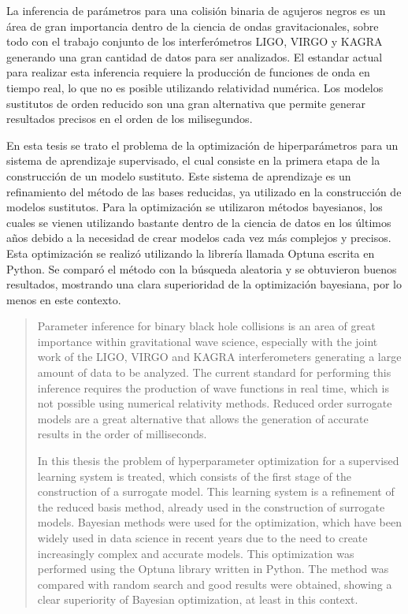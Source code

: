 \begin{resumen}%


La inferencia de parámetros para una colisión binaria de agujeros negros es un área de gran importancia dentro de la ciencia de ondas gravitacionales, sobre todo con el trabajo conjunto de los interferómetros LIGO, VIRGO y KAGRA generando una gran cantidad de datos para ser analizados. El estandar actual para realizar esta inferencia requiere la producción de funciones de onda en tiempo real, lo que no es posible utilizando relatividad numérica. Los modelos sustitutos de orden reducido son una gran alternativa que permite generar resultados precisos en el orden de los milisegundos.

En esta tesis se trato el problema de la optimización de hiperparámetros para un sistema de aprendizaje supervisado, el cual consiste en la primera etapa de la construcción de un modelo sustituto. Este sistema de aprendizaje es un refinamiento del método de las bases reducidas, ya utilizado en la construcción de modelos sustitutos. 
Para la optimización se utilizaron métodos bayesianos, los cuales se vienen utilizando bastante dentro de la ciencia de datos en los últimos años debido a la necesidad de crear modelos cada vez más complejos y precisos. Esta optimización se realizó utilizando la librería llamada Optuna escrita en Python. Se comparó el método con la búsqueda aleatoria y se obtuvieron buenos resultados, mostrando una clara superioridad de la optimización bayesiana, por lo menos en este contexto.


\end{resumen}

\begin{abstract}%
Parameter inference for binary black hole collisions is an area of great importance within gravitational wave science, especially with the joint work of the LIGO, VIRGO and KAGRA interferometers generating a large amount of data to be analyzed. The current standard for performing this inference requires the production of wave functions in real time, which is not possible using numerical relativity methods. Reduced order surrogate models are a great alternative that allows the generation of accurate results in the order of milliseconds.

In this thesis the problem of hyperparameter optimization for a supervised learning system is treated, which consists of the first stage of the construction of a surrogate model. This learning system is a refinement of the reduced basis method, already used in the construction of surrogate models. 
Bayesian methods were used for the optimization, which have been widely used in data science in recent years due to the need to create increasingly complex and accurate models. This optimization was performed using the Optuna library written in Python. The method was compared with random search and good results were obtained, showing a clear superiority of Bayesian optimization, at least in this context.

\end{abstract}


